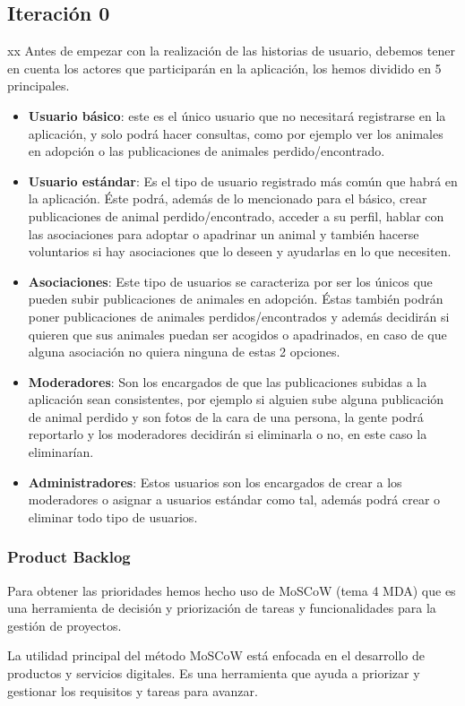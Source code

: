 \subsection{Iteración 0}
xx Antes de empezar con la realización de las historias de usuario, debemos tener en cuenta los actores que participarán en la aplicación, los hemos dividido en 5 principales.
\begin{itemize}
	\item \textbf{Usuario básico}: este es el único usuario que no necesitará registrarse en la aplicación, y solo podrá hacer consultas, como por ejemplo ver los animales en adopción o las publicaciones de animales perdido/encontrado.
	\item \textbf{Usuario estándar}: Es el tipo de usuario registrado más común que habrá en la aplicación. Éste podrá, además de lo mencionado para el básico, crear publicaciones de animal perdido/encontrado, acceder a su perfil, hablar con las asociaciones para adoptar o apadrinar un animal y también hacerse voluntarios si hay asociaciones que lo deseen y ayudarlas en lo que necesiten.
	\item \textbf{Asociaciones}: Este tipo de usuarios se caracteriza por ser los únicos que pueden subir publicaciones de animales en adopción. Éstas también podrán poner publicaciones de animales perdidos/encontrados y además decidirán si quieren que sus animales puedan ser acogidos o apadrinados, en caso de que alguna asociación no quiera ninguna de estas 2 opciones.
	\item \textbf{Moderadores}: Son los encargados de que las publicaciones subidas a la aplicación sean consistentes, por ejemplo si alguien sube alguna publicación de animal perdido y son fotos de la cara de una persona, la gente podrá reportarlo y los moderadores decidirán si eliminarla o no, en este caso la eliminarían.
	\item \textbf{Administradores}: Estos usuarios son los encargados de crear a los moderadores o asignar a usuarios estándar como tal, además podrá crear o eliminar todo tipo de usuarios.
\end{itemize}
\subsubsection{Product Backlog}
Para obtener las prioridades hemos hecho uso de MoSCoW (tema 4 MDA) que es una herramienta de decisión y priorización de tareas y funcionalidades para la gestión de proyectos.

La utilidad principal del método MoSCoW está enfocada en el desarrollo de productos y servicios digitales. Es una herramienta que ayuda a priorizar y gestionar los requisitos y tareas para avanzar.

